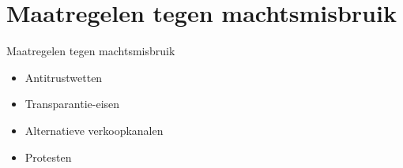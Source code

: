 \documentclass{beamer}
\begin{document}
    
\section[Maatregelen tegen machtsmisbruik]{Maatregelen tegen machtsmisbruik}
\begin{frame}{Maatregelen tegen machtsmisbruik}
    \LARGE{
        \begin{itemize}
            \item Antitrustwetten
            \item Transparantie-eisen
            \item Alternatieve verkoopkanalen
            \item Protesten
        \end{itemize}
    }
\end{frame}
\end{document}
